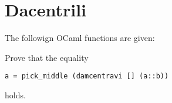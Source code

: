 \section{Dacentrili}
The followign OCaml functions are given:

Prove that the equality
\begin{center}
    \begin{lstlisting}
a = pick_middle (damcentravi [] (a::b))\end{lstlisting}
\end{center}
holds.